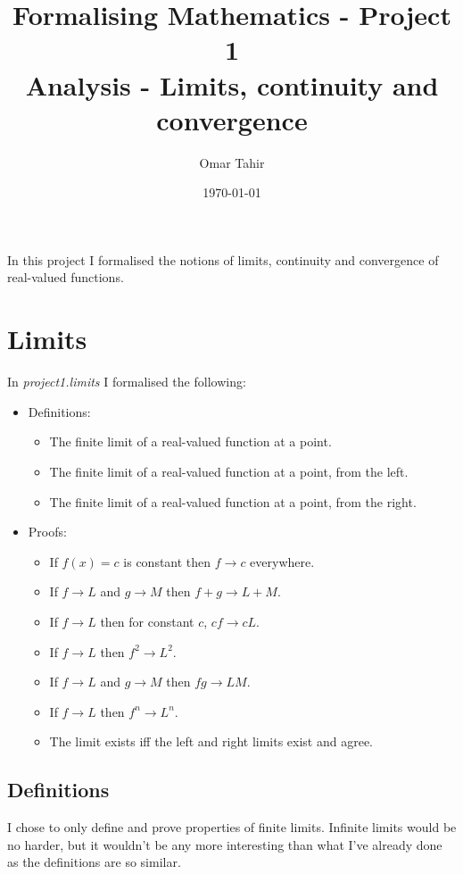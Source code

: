 \documentclass[a4paper, twoside, 11pt]{article}
\title{Formalising Mathematics - Project 1 \\ Analysis - Limits, continuity and convergence}
\author{Omar Tahir}
\date{\today}
\theoremstyle{definition}
\theoremstyle{plain}
\theoremstyle{remark}
\begin{document}
\maketitle

In this project I formalised the notions of limits, continuity and convergence of real-valued functions.

\section{Limits}

In \emph{project1.limits} I formalised the following:
\begin{itemize}
    \item Definitions:
    \begin{itemize}
        \item The finite limit of a real-valued function at a point.
        \item The finite limit of a real-valued function at a point, from the left.
        \item The finite limit of a real-valued function at a point, from the right.
    \end{itemize}
    \item Proofs:
    \begin{itemize}
        \item If $f(x) = c$ is constant then $f \to c$ everywhere.
        \item If $f \to L$ and $g \to M$ then $f + g \to L + M$.
        \item If $f \to L$ then for constant $c$, $cf \to cL$.
        \item If $f \to L$ then $f^{2} \to L^{2}$.
        \item If $f \to L$ and $g \to M$ then $fg \to LM$.
        \item If $f \to L$ then $f^{n} \to L^{n}$.
        \item The limit exists iff the left and right limits exist and agree.
    \end{itemize}
\end{itemize}

\subsection*{Definitions}

I chose to only define and prove properties of finite limits. Infinite limits would be no harder, but it wouldn't be any more interesting than what I've already done as the definitions are so similar.
\end{document}
